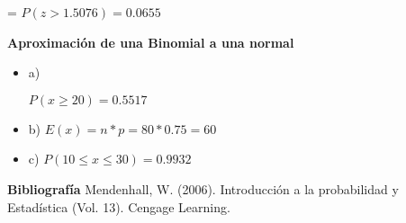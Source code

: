 \documentclass{../oxmathproblems}
\begin{document}
\begin{questions}
\begin{itemize}
= 
$ P(z > 1.5076) = 0.0655 $

\end{itemize}

\miquestion \textbf {Aproximación de una Binomial a una normal}
\begin{itemize}
\item  a) 

$ P (x \geq 20 ) = 0.5517$ 

\item  b)  $ E(x) = n * p = 80 *0.75 = 60 $ 
\item  c)
$ P(10 \leq x \leq 30 ) = 0.9932 $ 
\end{itemize}


\end{questions}

\textbf{Bibliografía}
Mendenhall, W. (2006). Introducción a la probabilidad y Estadística (Vol. 13). Cengage Learning.
\end{document}

